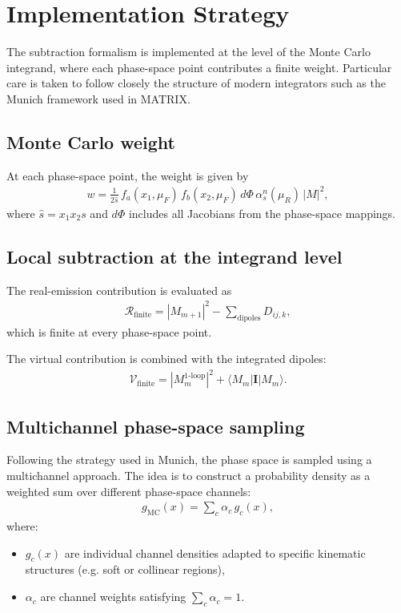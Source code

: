 \section{Implementation Strategy}

The subtraction formalism is implemented at the level of the Monte Carlo
integrand, where each phase-space point contributes a finite weight.
Particular care is taken to follow closely the structure of modern
integrators such as the Munich framework used in MATRIX.

\subsection{Monte Carlo weight}

At each phase-space point, the weight is given by
\begin{align}
w =
\frac{1}{2\hat{s}} \,
f_a(x_1,\mu_F) \, f_b(x_2,\mu_F)
\, d\Phi \,
\alpha_s^n(\mu_R)
\, |M|^2,
\end{align}
where $\hat{s} = x_1 x_2 s$ and $d\Phi$ includes all Jacobians from the
phase-space mappings.

\subsection{Local subtraction at the integrand level}

The real-emission contribution is evaluated as
\begin{align}
\mathcal{R}_{\text{finite}} =
|M_{m+1}|^2 - \sum_{\text{dipoles}} D_{ij,k},
\end{align}
which is finite at every phase-space point.

The virtual contribution is combined with the integrated dipoles:
\begin{align}
\mathcal{V}_{\text{finite}} =
|M_m^{\text{1-loop}}|^2 + \langle M_m | \mathbf{I} | M_m \rangle.
\end{align}

\subsection{Multichannel phase-space sampling}

Following the strategy used in Munich, the phase space is sampled using
a multichannel approach. The idea is to construct a probability density
as a weighted sum over different phase-space channels:
\begin{align}
g_{\text{MC}}(x) = \sum_c \alpha_c \, g_c(x),
\end{align}
where:
\begin{itemize}
    \item $g_c(x)$ are individual channel densities adapted to specific
    kinematic structures (e.g. soft or collinear regions),
    \item $\alpha_c$ are channel weights satisfying $\sum_c \alpha_c = 1$.
\end{itemize}


